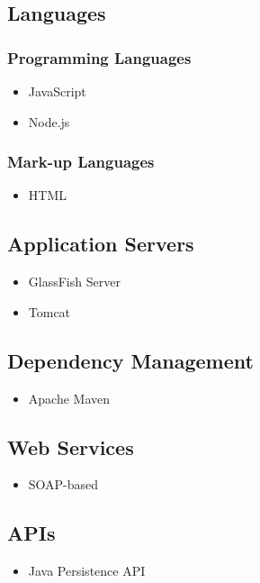 \subsection{Languages}
\subsubsection{Programming Languages}
\begin{itemize}
	\item JavaScript	
	\item Node.js
\end{itemize}

\subsubsection{Mark-up Languages}
\begin{itemize}
	\item HTML
\end{itemize}


\subsection{Application Servers}
\begin{itemize}
	\item GlassFish Server
	\item Tomcat
\end{itemize}

\subsection{Dependency Management}
\begin{itemize}
	\item Apache Maven
\end{itemize}

\subsection{Web Services}
\begin{itemize}
	\item SOAP-based
\end{itemize} 


\subsection{APIs}
\begin{itemize}
	\item Java Persistence API
\end{itemize}


